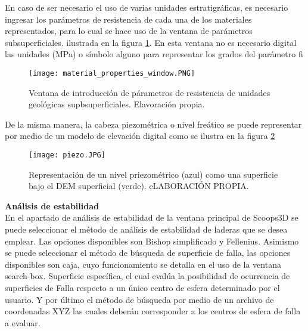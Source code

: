 En caso de ser necesario el uso de varias unidades estratigr\'{a}ficas, es necesario ingresar
los par\'{a}metros de resistencia de cada una de los materiales representados, para lo cual se
hace uso de la ventana de par\'{a}metros subsuperficiales. ilustrada en la figura \ref{fig:parameters}. En esta ventana no es necesario  digital las unidades (MPa) o s\'imbolo alguno para representar los grados del par\'ametro  fi \\

\begin{figure}[H]
\centering
\texttt{[image: material\_properties\_window.PNG]}
\caption{Ventana de introducci\'on de p\'arametros de resistencia de unidades geol\'ogicas supbsuperficiales. Elavoraci\'on propia.}
\label{fig:parameters}
\end{figure}


De la misma manera, la cabeza piezom\'{e}trica o nivel fre\'{a}tico se puede representar por
medio de un modelo de elevaci\'{o}n digital como se ilustra en la figura \ref{modelo piezometrico}
\\


\begin{figure}[H]
\centering
\texttt{[image: piezo.JPG]}
\caption{Representaci\'on de un nivel priezom\'etrico (azul) como una superficie bajo el DEM superficial (verde). eLABORACI\'ON PROPIA.}
\label{modelo piezometrico}
\end{figure}

\textbf{An\'{a}lisis de estabilidad}\\
En el apartado de an\'{a}lisis de estabilidad de la ventana principal de Scoops3D se puede
seleccionar el m\'{e}todo de an\'{a}lisis de estabilidad de laderas que se desea emplear. Las
opciones disponibles son Bishop simplificado y Fellenius.
Asimismo se puede seleccionar el m\'{e}todo de b\'{u}squeda de superficie de falla, las opciones
disponibles son caja, cuyo funcionamiento se detalla en el uso de la ventana search-box.
Superficie espec\'{i}fica, el cual eval\'{u}a la posibilidad de ocurrencia de superficies de Falla
respecto a un \'{u}nico centro de esfera determinado por el usuario. Y por \'{u}ltimo el m\'{e}todo de
b\'usqueda por medio de un archivo de coordenadas XYZ las cuales deber\'an corresponder a
los centros de esfera de falla a evaluar.\par

